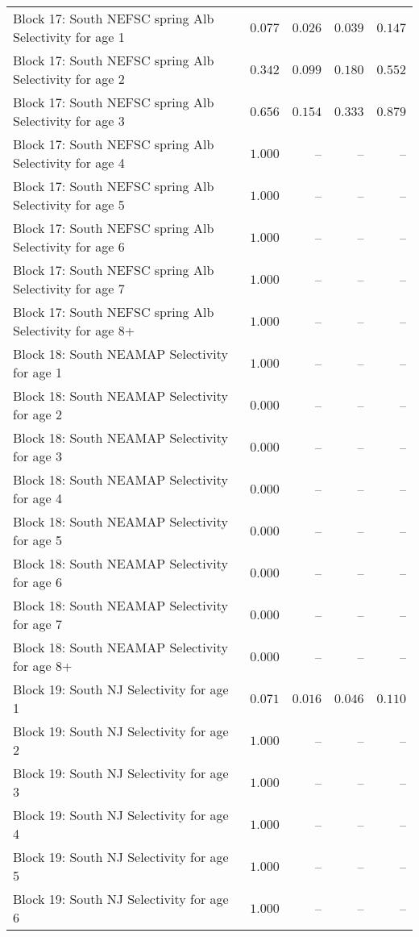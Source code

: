 \documentclass[
]{article}
\begin{document}
\begin{landscape}
\begin{longtable}[t]{lrrrr}
Block 17: South NEFSC spring Alb Selectivity for age 1 & $0.077$ & $0.026$ & $0.039$ & $0.147$\\
Block 17: South NEFSC spring Alb Selectivity for age 2 & $0.342$ & $0.099$ & $0.180$ & $0.552$\\
Block 17: South NEFSC spring Alb Selectivity for age 3 & $0.656$ & $0.154$ & $0.333$ & $0.879$\\
Block 17: South NEFSC spring Alb Selectivity for age 4 & $1.000$ & -- & -- & --\\
\addlinespace
Block 17: South NEFSC spring Alb Selectivity for age 5 & $1.000$ & -- & -- & --\\
Block 17: South NEFSC spring Alb Selectivity for age 6 & $1.000$ & -- & -- & --\\
Block 17: South NEFSC spring Alb Selectivity for age 7 & $1.000$ & -- & -- & --\\
Block 17: South NEFSC spring Alb Selectivity for age 8+ & $1.000$ & -- & -- & --\\
Block 18: South NEAMAP Selectivity for age 1 & $1.000$ & -- & -- & --\\
\addlinespace
Block 18: South NEAMAP Selectivity for age 2 & $0.000$ & -- & -- & --\\
Block 18: South NEAMAP Selectivity for age 3 & $0.000$ & -- & -- & --\\
Block 18: South NEAMAP Selectivity for age 4 & $0.000$ & -- & -- & --\\
Block 18: South NEAMAP Selectivity for age 5 & $0.000$ & -- & -- & --\\
Block 18: South NEAMAP Selectivity for age 6 & $0.000$ & -- & -- & --\\
\addlinespace
Block 18: South NEAMAP Selectivity for age 7 & $0.000$ & -- & -- & --\\
Block 18: South NEAMAP Selectivity for age 8+ & $0.000$ & -- & -- & --\\
Block 19: South NJ Selectivity for age 1 & $0.071$ & $0.016$ & $0.046$ & $0.110$\\
Block 19: South NJ Selectivity for age 2 & $1.000$ & -- & -- & --\\
Block 19: South NJ Selectivity for age 3 & $1.000$ & -- & -- & --\\
\addlinespace
Block 19: South NJ Selectivity for age 4 & $1.000$ & -- & -- & --\\
Block 19: South NJ Selectivity for age 5 & $1.000$ & -- & -- & --\\
Block 19: South NJ Selectivity for age 6 & $1.000$ & -- & -- & --\\

\end{longtable}
\end{landscape}
\end{document}
